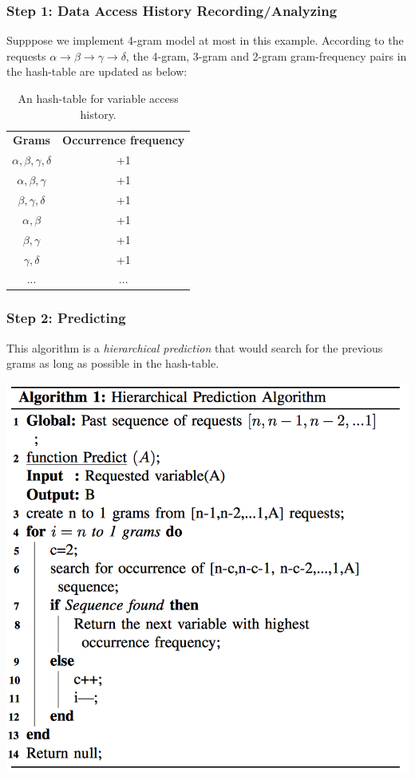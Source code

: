 \documentclass{beamer}
\begin{document}
\begin{frame}
\frametitle{Step 1: Data Access History Recording/Analyzing}
Supppose we implement 4-gram model at most in this example. According to the requests $\alpha \rightarrow \beta \rightarrow \gamma \rightarrow \delta$, the 4-gram, 3-gram and 2-gram gram-frequency pairs in the hash-table are updated as below:
    \begin{center}
    \begin{table}
    \begin{tabular}{|c|c|}
            \textbf{Grams} & \textbf{Occurrence frequency} \\
            $\alpha, \beta, \gamma, \delta$ & +1 \\
            $\alpha, \beta, \gamma$ & +1 \\
            $\beta, \gamma, \delta$ & +1 \\
            $\alpha, \beta$ & +1 \\
            $\beta, \gamma$ & +1 \\
            $\gamma, \delta$ & +1 \\
            ... & ... \\
    \end{tabular}
    \caption{An hash-table for variable access history.}
    \end{table}
    \end{center}
          
\end{frame}

\begin{frame}
\frametitle{Step 2: Predicting}
            This algorithm is a \textit{hierarchical prediction} that would search for the previous grams as long as possible in the hash-table.
    \begin{center}
            \includegraphics[width=.5\textwidth]{images/stacker_fig_3.png}
    \end{center}
\end{frame}
\end{document}
